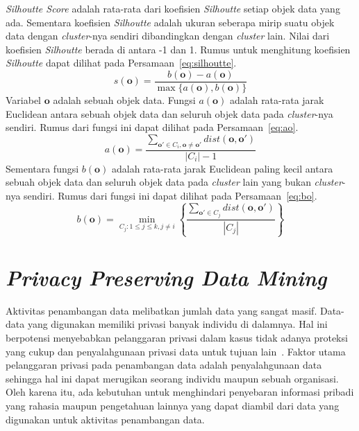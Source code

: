 \textit{Silhoutte Score} adalah rata-rata dari koefisien \textit{Silhoutte} setiap objek data yang ada. Sementara koefisien \textit{Silhoutte} adalah ukuran seberapa mirip suatu objek data dengan \textit{cluster}-nya sendiri dibandingkan dengan \textit{cluster} lain. Nilai dari koefisien \textit{Silhoutte} berada di antara -1 dan 1. Rumus untuk menghitung koefisien \textit{Silhoutte} dapat dilihat pada Persamaan~\ref{eq:silhoutte}.~\cite{jiawei:12:datmin}
\begin{equation}\label{eq:silhoutte}
	s(\mathbf{o}) = \frac{b(\mathbf{o})-a(\mathbf{o})}{\max{\{a(\mathbf{o}),b(\mathbf{o})}\}}
\end{equation}
Variabel \(\mathbf{o}\) adalah sebuah objek data. Fungsi \(a(\mathbf{o})\) adalah rata-rata jarak Euclidean antara sebuah objek data dan seluruh objek data pada \textit{cluster}-nya sendiri. Rumus dari fungsi ini dapat dilihat pada Persamaan~\ref{eq:ao}.
\begin{equation}\label{eq:ao}
	a(\mathbf{o}) = \frac{\sum^{}_{\mathbf{o'} \in C_{i},\mathbf{o}\neq\mathbf{o'}}dist(\mathbf{o},\mathbf{o'})}{|C_{i}|-1}
\end{equation}
Sementara fungsi \(b(\mathbf{o})\) adalah rata-rata jarak Euclidean paling kecil antara sebuah objek data dan seluruh objek data pada \textit{cluster} lain yang bukan \textit{cluster}-nya sendiri. Rumus dari fungsi ini dapat dilihat pada Persamaan~\ref{eq:bo}.
\begin{equation}\label{eq:bo}
	b(\mathbf{o}) = \min_{C_{j}:1\leq j \leq k,j\neq i}\left\{\frac{\sum^{}_{\mathbf{o'} \in C_{j}}dist(\mathbf{o},\mathbf{o'})}{|C_{j}|}\right\}
\end{equation}

\section{\textit{Privacy Preserving Data Mining}}
\label{sec:ppdm}

Aktivitas penambangan data melibatkan jumlah data yang sangat masif. Data-data yang digunakan memiliki privasi banyak individu di dalamnya. Hal ini berpotensi menyebabkan pelanggaran privasi dalam kasus tidak adanya proteksi yang cukup dan penyalahgunaan privasi data untuk tujuan lain~\cite{rezaseifi:11:ppdm}. Faktor utama pelanggaran privasi pada penambangan data adalah penyalahgunaan data sehingga hal ini dapat merugikan seorang individu maupun sebuah organisasi. Oleh karena itu, ada kebutuhan untuk menghindari penyebaran informasi pribadi yang rahasia maupun pengetahuan lainnya yang dapat diambil dari data yang digunakan untuk aktivitas penambangan data.

